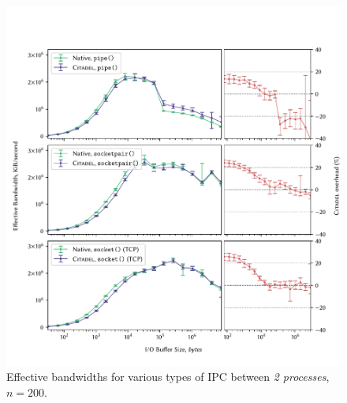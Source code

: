 \begin{figure}[]
    \centering
    \includegraphics[width=\linewidth]{figures/graphs/ipc-2proc.pdf}
    \vspace{-5mm}
    \caption{Effective bandwidths for various types of IPC between \textit{2 processes}, $n=200$.}
    \label{fig:ipc-2proc-graph}
\end{figure}



